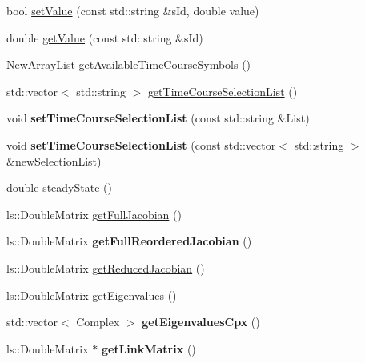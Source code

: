 \begin{DoxyCompactItemize}
\item 
bool \hyperlink{classrr_1_1_road_runner_a27c852e00c2eae29242a2e4993d6e5d8}{set\-Value} (const std\-::string \&s\-Id, double value)
\item 
double \hyperlink{classrr_1_1_road_runner_aa8df587043e43c8d54e3f3293cecd767}{get\-Value} (const std\-::string \&s\-Id)
\item 
New\-Array\-List \hyperlink{classrr_1_1_road_runner_acb6ac6676114cf7658d39af85f19b0d3}{get\-Available\-Time\-Course\-Symbols} ()
\item 
std\-::vector$<$ std\-::string $>$ \hyperlink{classrr_1_1_road_runner_a59e81eb385e66c02671df6c9cd30297b}{get\-Time\-Course\-Selection\-List} ()
\item 
\hypertarget{classrr_1_1_road_runner_a32c932092a000311b23001c6fe16a5c0}{void {\bfseries set\-Time\-Course\-Selection\-List} (const std\-::string \&List)}\label{classrr_1_1_road_runner_a32c932092a000311b23001c6fe16a5c0}

\item 
\hypertarget{classrr_1_1_road_runner_a7ef87de1f436bf2317f2930cf4a3d85a}{void {\bfseries set\-Time\-Course\-Selection\-List} (const std\-::vector$<$ std\-::string $>$ \&new\-Selection\-List)}\label{classrr_1_1_road_runner_a7ef87de1f436bf2317f2930cf4a3d85a}

\item 
double \hyperlink{classrr_1_1_road_runner_a53b8b7426d67ec2c15ed2b19785253e4}{steady\-State} ()
\item 
ls\-::\-Double\-Matrix \hyperlink{classrr_1_1_road_runner_af51e91db7ddc73786511271278f6c096}{get\-Full\-Jacobian} ()
\item 
\hypertarget{classrr_1_1_road_runner_a050e99e35e27a60e795825fdeb58c21d}{ls\-::\-Double\-Matrix {\bfseries get\-Full\-Reordered\-Jacobian} ()}\label{classrr_1_1_road_runner_a050e99e35e27a60e795825fdeb58c21d}

\item 
ls\-::\-Double\-Matrix \hyperlink{classrr_1_1_road_runner_a94471743a00815af37b0e598208605a5}{get\-Reduced\-Jacobian} ()
\item 
ls\-::\-Double\-Matrix \hyperlink{classrr_1_1_road_runner_af2ffe24f0f93699601b92d79ec291aa2}{get\-Eigenvalues} ()
\item 
\hypertarget{classrr_1_1_road_runner_aaba61d3b9bb97c7a8ac5262cb731da7f}{std\-::vector$<$ Complex $>$ {\bfseries get\-Eigenvalues\-Cpx} ()}\label{classrr_1_1_road_runner_aaba61d3b9bb97c7a8ac5262cb731da7f}

\item 
\hypertarget{classrr_1_1_road_runner_a7dc49b36a1511224cf0d31cf701c79fc}{ls\-::\-Double\-Matrix $\ast$ {\bfseries get\-Link\-Matrix} ()}\label{classrr_1_1_road_runner_a7dc49b36a1511224cf0d31cf701c79fc}


\end{DoxyCompactItemize}
